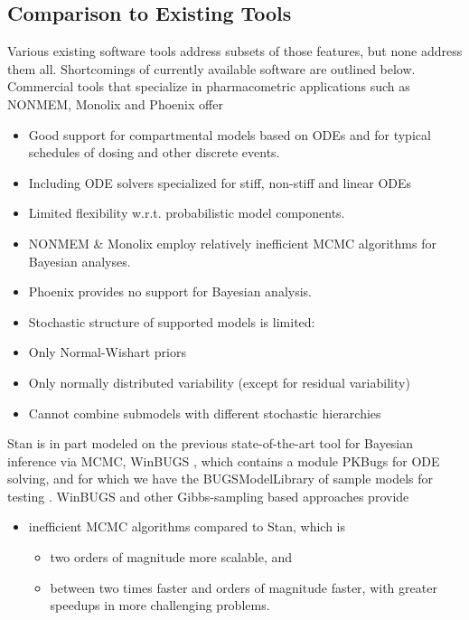 \documentclass[11pt]{article}
\begin{document}
\subsection*{Comparison to Existing Tools}\label{existing}

Various existing software tools address subsets of those features, but
none address them all. Shortcomings of currently available software
are outlined below. Commercial tools that specialize in pharmacometric
applications such as NONMEM, Monolix and Phoenix offer

\begin{itemize}
\item Good support for compartmental models based on ODEs and for
  typical schedules of dosing and other discrete events.
\item Including ODE solvers specialized for stiff, non-stiff and
  linear ODEs
\item Limited flexibility w.r.t. probabilistic model components.
\item NONMEM \& Monolix employ relatively inefficient MCMC algorithms
  for Bayesian analyses.
\item Phoenix provides no support for Bayesian analysis.
\item Stochastic structure of supported models is limited:
\item Only Normal-Wishart priors
\item Only normally distributed variability (except for residual
  variability)
\item Cannot combine submodels with different stochastic hierarchies
\end{itemize}

Stan is in part modeled on the previous state-of-the-art tool for
Bayesian inference via MCMC, WinBUGS \cite{lunn-et-al:2000}, which
contains a module PKBugs for ODE solving, and for which we have the
BUGSModelLibrary of sample models for testing
\cite{gastonguay-et-al:2010}.  WinBUGS and other Gibbs-sampling based
approaches provide

\begin{itemize}
\item inefficient MCMC algorithms compared to Stan, which is
\begin{itemize}
\item  two orders of magnitude more scalable, and
\item  between two times faster and orders of magnitude faster,
  with greater speedups in more challenging problems.
\end{itemize}
\end{itemize}
\end{document}
